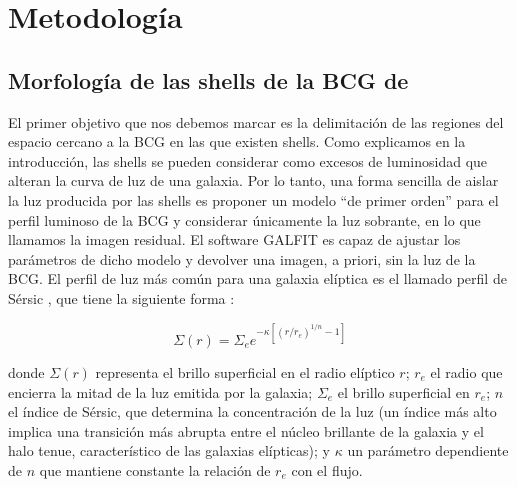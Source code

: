 \section{Metodología}
\label{sec:metodologia}
\subsection{Morfología de las shells de la BCG de \clust{}} \label{sec:contorno}
El primer objetivo que nos debemos marcar es la delimitación de las regiones del espacio cercano a la BCG en las que existen shells. Como explicamos en la introducción, las shells se pueden considerar como excesos de luminosidad que alteran la curva de luz de una galaxia. Por lo tanto, una forma sencilla de aislar la luz producida por las shells es proponer un modelo \enquote{de primer orden} para el perfil luminoso de la BCG y considerar únicamente la luz sobrante, en lo que llamamos la imagen residual. El software GALFIT \citep{pengDetailedStructuralDecomposition2002, pengDETAILEDDECOMPOSITIONGALAXY2010} es capaz de ajustar los parámetros de dicho modelo y devolver una imagen, a priori, sin la luz de la BCG. El perfil de luz más común para una galaxia elíptica es el llamado perfil de Sérsic \citep{sersicInfluenceAtmosphericInstrumental1963,savorgnanSupermassiveBlackHole2013}, que tiene la siguiente forma \citep{pengDetailedStructuralDecomposition2002}:

\begin{equation}
    \Sigma (r) = \Sigma_e e^{-\kappa [(r/r_e)^{1/n} - 1]}
\end{equation}

donde \(\Sigma (r)\) representa el brillo superficial en el radio elíptico \(r\); \(r_e\) el radio que encierra la mitad de la luz emitida por la galaxia; \(\Sigma_e\) el brillo superficial en \(r_e\); \(n\) el índice de Sérsic, que determina la concentración de la luz (un índice más alto implica una transición más abrupta entre el núcleo brillante de la galaxia y el halo tenue, característico de las galaxias elípticas); y \(\kappa\) un parámetro dependiente de \(n\) que mantiene constante la relación de \(r_e\) con el flujo. \par

